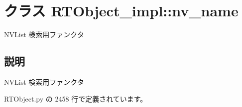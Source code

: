 \section{クラス RTObject\_\-impl::nv\_\-name}
\label{classsource__py_1_1_r_t_object_1_1_r_t_object__impl_1_1nv__name}
NVList 検索用ファンクタ  




\subsection{説明}
NVList 検索用ファンクタ 

 RTObject.py の 2458 行で定義されています。